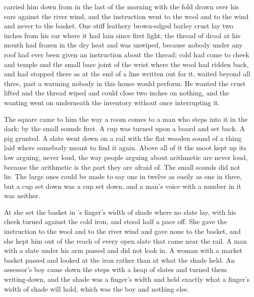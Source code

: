  carried him down from  in the last of the morning with the fold drawn over his ears against the river wind, and the instruction went to the wool and to the wind and never to the basket. One stiff leathery brown-edged barley crust lay two inches from his ear where it had lain since first light; the thread of drool at his mouth had frozen in the dry heat and was unwiped, because nobody under any roof had ever been given an instruction about the thread; cold had come to cheek and temple and the small bare joint of the wrist where the wool had ridden back, and had stopped there as at the end of a line written out for it.  waited beyond all three, past a warming nobody in this house would perform. He wanted the crust lifted and the thread wiped and could close two inches on nothing, and the wanting went on underneath the inventory without once interrupting it.

The square came to him the way a room comes to a man who steps into it in the dark: by the small sounds first. A cup was turned upon a board and set back. A pig grunted. A slate went down on a rail with the flat wooden sound of a thing laid where somebody meant to find it again. Above all of it the moot kept up its low arguing, never loud, the way people arguing about arithmetic are never loud, because the arithmetic is the part they are afraid of. The small sounds did not lie. The large ones could be made to say one in twelve as easily as one in three, but a cup set down was a cup set down, and a man's voice with a number in it was neither.

At  she set the basket in 's finger's width of shade where no slate lay, with his cheek turned against the cold iron, and stood half a pace off. She gave the instruction to the wool and to the river wind and gave none to the basket, and she kept him out of the reach of every open slate that came near the rail. A man with a slate under his arm passed and did not look in. A woman with a market basket passed and looked at the iron rather than at what the shade held. An assessor's boy came down the steps with a heap of slates and turned them writing-down, and the shade was a finger's width and held exactly what a finger's width of shade will hold, which was the boy and nothing else.

